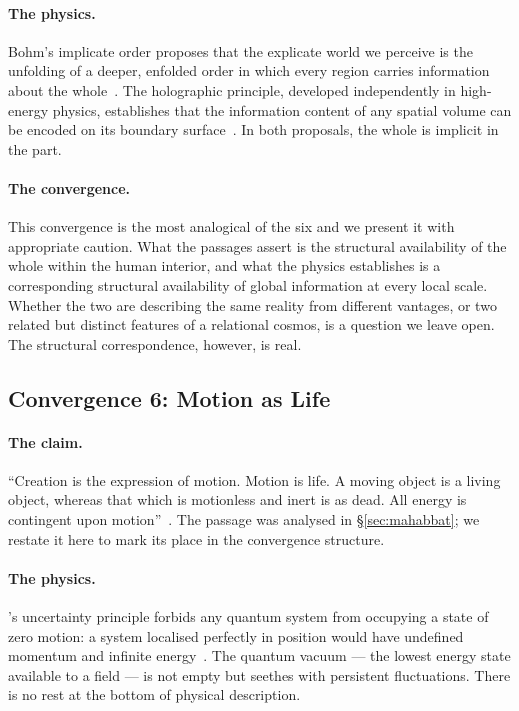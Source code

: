 \paragraph{The physics.}
Bohm's implicate order proposes that the explicate world we perceive is
the unfolding of a deeper, enfolded order in which every region carries
information about the whole~\citep{Bohm1980}.
The holographic principle, developed independently in high-energy physics,
establishes that the information content of any spatial volume can be encoded
on its boundary surface~\citep{tHooft1993,Susskind1995}.
In both proposals, the whole is implicit in the part.

\paragraph{The convergence.}
This convergence is the most analogical of the six and we present it with
appropriate caution.
What the \bahai passages assert is the structural availability of the whole
within the human interior, and what the physics establishes is a corresponding
structural availability of global information at every local scale.
Whether the two are describing the same reality from different vantages, or
two related but distinct features of a relational cosmos, is a question we
leave open.
The structural correspondence, however, is real.

\subsection{Convergence 6: Motion as Life}

\paragraph{The \bahai claim.}
``Creation is the expression of motion. Motion is life. A moving object is a
living object, whereas that which is motionless and inert is as dead.
All energy is contingent upon motion''~\citep[Talk 52]{PUP}.
The passage was analysed in \S\ref{sec:mahabbat}; we restate it here to mark
its place in the convergence structure.

\paragraph{The physics.}
\citeauthor{Heisenberg1927}'s uncertainty principle forbids any quantum system
from occupying a state of zero motion: a system localised perfectly in position
would have undefined momentum and infinite energy~\citep{Heisenberg1927}.
The quantum vacuum --- the lowest energy state available to a field --- is not
empty but seethes with persistent fluctuations.
There is no rest at the bottom of physical description.

